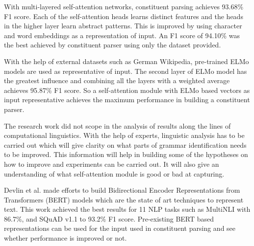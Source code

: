 \documentclass[a4paper, 11pt]{article}
\begin{document}
With multi-layered self-attention networks, constituent parsing achieves 93.68\% F1 score. Each of the self-attention heads learns distinct features and the heads in the higher layer learn abstract patterns. This is improved by using character and word embeddings as a representation of input. An F1 score of 94.10\% was the best achieved by constituent parser using only the dataset provided. 

With the help of external datasets such as German Wikipedia, pre-trained ELMo models are used as representative of input. The second layer of ELMo model has the greatest influence and combining all the layers with a weighted average achieves 95.87\% F1 score. So a self-attention module with ELMo based vectors as input representative achieves the maximum performance in building a constituent parser. 

The research work did not scope in the analysis of results along the lines of computational linguistics. With the help of experts, linguistic analysis has to be carried out which will give clarity on what parts of grammar identification needs to be improved. This information will help in building some of the hypotheses on how to improve and experiments can be carried out. It will also give an understanding of what self-attention module is good or bad at capturing.

Devlin et al. made efforts to build Bidirectional Encoder Representations from Transformers (BERT) \parencite{devlin2018bert} models which are the state of art techniques to represent text. This work achieved the best results for 11 NLP tasks such as MultiNLI with 86.7\%, and SQuAD v1.1 to 93.2\% F1 score. Pre-existing BERT based representations can be used for the input used in constituent parsing and see whether performance is improved or not.



\newpage
\printbibliography
%
\end{document}
